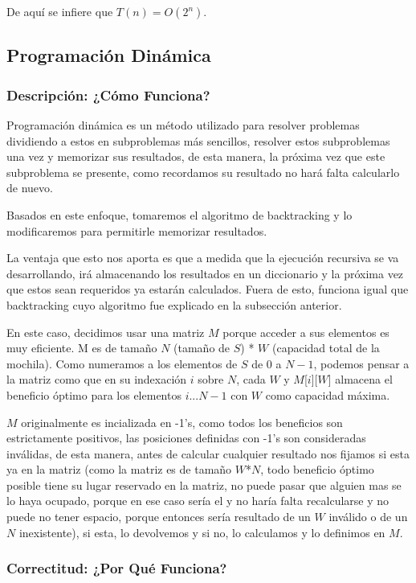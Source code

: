 \documentclass[a4paper]{article}
\begin{document}
De aquí se infiere que $T(n) = O(2^n)$.    

\subsection{Programación Dinámica}

\subsubsection{Descripción: ¿Cómo Funciona?}

Programación dinámica es un método utilizado para resolver problemas dividiendo a estos en subproblemas más sencillos, resolver estos subproblemas una vez y memorizar sus resultados, de esta manera, la próxima vez que este subproblema se presente, como recordamos su resultado no hará falta calcularlo de nuevo. 

Basados en este enfoque, tomaremos el algoritmo de backtracking y lo modificaremos para permitirle memorizar resultados.

La ventaja que esto nos aporta es que a medida que la ejecución recursiva se va desarrollando, irá almacenando los resultados en un diccionario y la próxima vez que estos sean requeridos ya estarán calculados. Fuera de esto, funciona igual que backtracking cuyo algoritmo fue explicado en la subsección anterior.

En este caso, decidimos usar una matriz $M$ porque acceder a sus elementos es muy eficiente. M es de tamaño $N$ (tamaño de $S$) * $W$ (capacidad total de la mochila). Como numeramos a los elementos de $S$ de 0 a $N - 1$, podemos pensar a la matriz como que en su indexación $i$ sobre $N$, cada $W$ y $M$[$i$][$W$] almacena el beneficio óptimo para los elementos $i$...$N - 1$ con $W$ como capacidad máxima.

$M$ originalmente es incializada en -1's, como todos los beneficios son estrictamente positivos, las posiciones definidas con -1's son consideradas inválidas, de esta manera, antes de calcular cualquier resultado nos fijamos si esta ya en la matriz (como la matriz es de tamaño $W$*$N$, todo beneficio óptimo posible tiene su lugar reservado en la matriz, no puede pasar que alguien mas se lo haya ocupado, porque en ese caso sería el y no haría falta recalcularse y no puede no tener espacio, porque entonces sería resultado de un $W$ inválido o de un $N$ inexistente), si esta, lo devolvemos y si no, lo calculamos y lo definimos en $M$.

\subsubsection{Correctitud: ¿Por Qué Funciona?}
\end{document}
